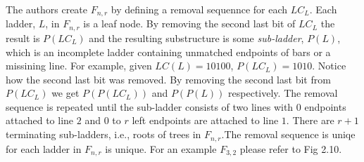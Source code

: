 The authors create $F_{n,r}$ by defining a removal sequennce for 
each $LC_{L}$. Each ladder, $L$, in 
$F_{n,r}$ is a leaf node. By removing the second last bit of $LC_{L}$ the result 
is $P(LC_{L})$ and the resulting substructure is some \emph{sub-ladder}, $P(L)$, which 
is an incomplete ladder containing unmatched endpoints of bars or a missining line. For example, 
given $LC(L)=10100$, $P(LC_{L})=1010$. Notice how the second last bit was removed. 
By removing the second last bit from $P(LC_{L})$ we get $P(P(LC_{L}))$ and $P(P(L))$ respectively.
The removal sequence is repeated until the sub-ladder consists of two lines with $0$ endpoints
attached to line $2$ and $0$ to $r$ left endpoints are attached to line $1$. There are $r+1$
terminating sub-ladders, i.e., roots of trees in $F_{n, r}$.The removal sequence is uniqe for each ladder in $F_{n,r}$ is unique.   
For an example $F_{3,2}$ please refer to Fig 2.10.\par
